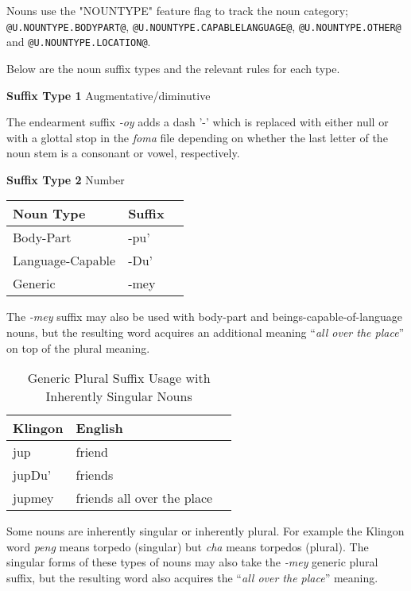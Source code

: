 \documentclass[11pt]{article}
\begin{document}
Nouns use the "NOUNTYPE" feature flag to track the noun category; \texttt{@U.NOUNTYPE.BODYPART@}, \texttt{@U.NOUNTYPE.CAPABLELANGUAGE@}, \texttt{@U.NOUNTYPE.OTHER@} and \texttt{@U.NOUNTYPE.LOCATION@}.

Below are the noun suffix types and the relevant rules for each type.

\textbf{Suffix Type 1} Augmentative/diminutive

The endearment suffix \textit{-oy} adds a dash '-' which is replaced with either null or with a glottal stop in the \textit{foma} file depending on whether the last letter of the noun stem is a consonant or vowel, respectively.

\textbf{Suffix Type 2} Number

	\begin{center}
	\begin{tabular}{lll}
	\toprule
	\bf{Noun Type} & \bf{Suffix} \\
	\midrule
	Body-Part & -pu' \\
	Language-Capable & -Du' \\
	Generic & -mey \\
	\bottomrule
	\end{tabular}
	\end{center}

The \textit{-mey} suffix may also be used with body-part and beings-capable-of-language nouns, but the resulting word acquires an additional meaning ``\textit{all over the place}'' on top of the plural meaning.
	
	\begin{table}[h]
	\begin{center}
	\begin{tabular}{lll}
	\toprule
	\bf Klingon & \bf English \\
	\midrule
	jup & friend \\
	jupDu' & friends \\
	jupmey & friends all over the place \\
	\bottomrule
	\end{tabular}
	\end{center}
	\caption{Generic Plural Suffix Usage with Inherently Singular Nouns}
	\end{table}

Some nouns are inherently singular or inherently plural. For example the Klingon word \textit{peng} means torpedo (singular) but \textit{cha} means torpedos (plural). The singular forms of these types of nouns may also take the \textit{-mey} generic plural suffix, but the resulting word also acquires the ``\textit{all over the place}'' meaning.
	
\end{document}
